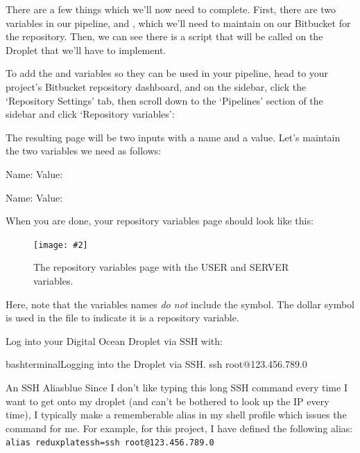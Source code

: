 \documentclass[paper=6in:9in,pagesize=pdftex,headinclude=on,footinclude=on,12pt,twoside]{scrbook}
\newcommand{\standardfigure}[3]{\begin{figure}[H]\begin{center}\texttt{[image: \#2]}\caption{#3}\label{fig:#2}\end{center}\end{figure}}
\begin{document}
There are a few things which we'll now need to complete. First, there are two variables in our pipeline,  and , which we'll need to maintain on our Bitbucket for the repository. Then, we can see there is a script  that will be called on the Droplet that we'll have to implement.


To add the  and  variables so they can be used in your pipeline, head to your project's Bitbucket repository dashboard, and on the sidebar, click the `Repository Settings' tab, then scroll down to the `Pipelines' section of the sidebar and click `Repository variables':

The resulting page will be two inputs with a name and a value. Let's maintain the two variables we need as follows:

\begin{arrows}
  \item Name:  Value: 
  \item Name:  Value: 
\end{arrows}

When you are done, your repository variables page should look like this:

\standardfigure{\textwidth}{/backend/repository-variables-page}{The repository variables page with the USER and SERVER variables.}

Here, note that the variables names \textit{do not} include the \codeword{\$} symbol. The dollar symbol is used in the  file to indicate it is a repository variable.


Log into your Digital Ocean Droplet via SSH with:

\begin{codeInput}{bash}{terminal}{Logging into the Droplet via SSH.}
ssh root@123.456.789.0
\end{codeInput}

\begin{highlightBox}{An SSH Alias}{blue}{\information}
Since I don't like typing this long SSH command every time I want to get onto my droplet (and can't be bothered to look up the IP every time), I typically make a rememberable alias in my shell profile which issues the command for me. For example, for this project, I have defined the following alias: \texttt{alias reduxplatessh=ssh root@123.456.789.0}
\end{highlightBox}
\end{document}
